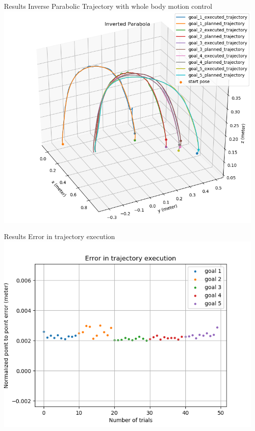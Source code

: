 \documentclass{beamer}
\begin{document}
	\begin{frame}{Results}
		\centering
		Inverse Parabolic Trajectory with whole body motion control
		\includegraphics[scale=0.4]{images/2/inv_par.png}
	\end{frame}
	
	\begin{frame}{Results}
		\centering
		Error in trajectory execution
		\includegraphics[scale=0.4]{images/2/inv_par_e.png}
	\end{frame}
	
\end{document}
